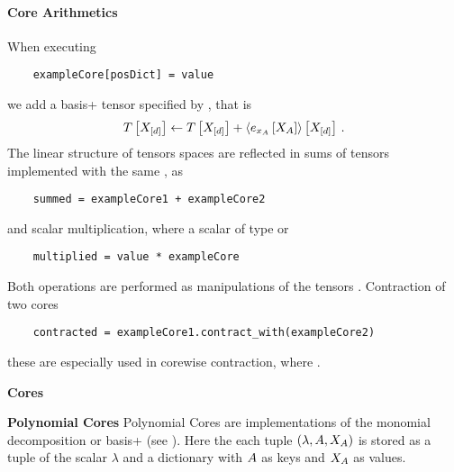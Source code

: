 \paragraph{Core Arithmetics}
When executing
\begin{lstlisting}
	exampleCore[posDict] = value
\end{lstlisting}
we add a basis+ tensor specified by , that is
\begin{align*}
	T\left[X_{[d]}\right] \leftarrow T\left[X_{[d]}\right] + \left\langle e_{x_{A}}\left[X_{A}\right]\right\rangle \left[ X_{[d]} \right] \, .
\end{align*}
The linear structure of tensors spaces are reflected in sums of tensors implemented with the same , as
\begin{lstlisting}
	summed = exampleCore1 + exampleCore2
\end{lstlisting}
and scalar multiplication, where a scalar  of type  or 
\begin{lstlisting}
	multiplied = value * exampleCore
\end{lstlisting}
Both operations are performed as manipulations of the tensors .
Contraction of two cores
\begin{lstlisting}
	contracted = exampleCore1.contract_with(exampleCore2)
\end{lstlisting}
these are especially used in corewise contraction, where .



\textbf{Cores}



\textbf{Polynomial Cores}
Polynomial Cores are implementations of the monomial decomposition or basis+ (see ).
Here the each tuple $(\lambda,A,X_{A})$ is stored as a tuple of the scalar $\lambda$ and a dictionary with $A$ as keys and $X_{A}$ as values.

